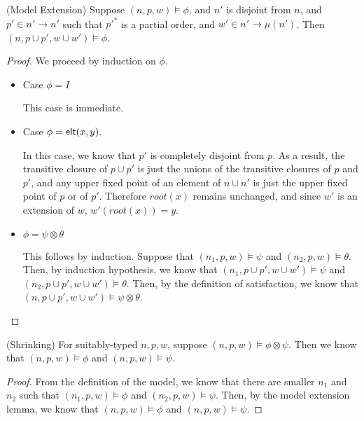 \begin{lemma}{(Model Extension)}
  Suppose $(n, p, w) \models \phi$, and $n'$ is disjoint from $n$, and $p' \in n' \to n'$ such that $p'^*$ is a partial order, and $w' \in n' \to \mu(n')$. Then $(n, p \cup p', w \cup w') \models \phi$. 
\end{lemma}

\begin{proof}
 We proceed by induction on $\phi$. 

 \begin{itemize}
   \item Case $\phi = I$

     This case is immediate. 

   \item Case $\phi = \mathsf{elt}({x}, {y})$. 

     In this case, we know that $p'$ is completely disjoint from
     $p$. As a result, the transitive closure of $p \cup p'$ is just
     the unions of the transitive closures of $p$ and $p'$, and any
     upper fixed point of an element of $n \cup n'$ is just the upper
     fixed point of $p$ or of $p'$. Therefore $\mathit{root}(x)$
     remains unchanged, and since $w'$ is an extension of $w$,
     $w'(\mathit{root}(x)) = y$.
     
     \item $\phi = \psi \otimes \theta$

       This follows by induction. Suppose that $(n_1, p, w) \models
       \psi$ and $(n_2, p, w) \models \theta$. Then, by induction
       hypothesis, we know that $(n_1, p \cup p', w \cup w') \models
       \psi$ and $(n_2, p \cup p', w \cup w') \models \theta$. Then,
       by the definition of satisfaction, we know that $(n, p \cup p',
       w \cup w') \models \psi \otimes \theta$.
 \end{itemize}
\end{proof}

\begin{lemma}{(Shrinking)}
For suitably-typed $n, p, w$, suppose $(n, p, w) \models \phi \otimes \psi$. Then 
we know that $(n, p, w) \models \phi$ and $(n, p, w) \models \psi$. 
\end{lemma}
\begin{proof}
  From the definition of the model, we know that there are smaller $n_1$ and $n_2$ 
such that $(n_1, p, w) \models \phi$ and $(n_2, p, w) \models \psi$. Then, by 
the model extension lemma, we know that $(n, p, w) \models \phi$ and $(n, p, w) \models \psi$. 
\end{proof}


